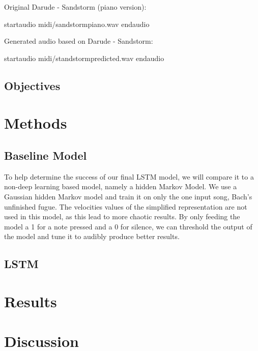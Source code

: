 \documentclass[11pt, twocolumn]{article}
\begin{document}
    \ifpdf
    \else
    Original Darude - Sandstorm (piano version):

    startaudio midi/sandstormpiano.wav endaudio

    Generated audio based on Darude - Sandstorm:

    startaudio midi/standstormpredicted.wav endaudio
    \fi

    \subsection{Objectives}


    \section{Methods}

    \subsection{Baseline Model}
    To help determine the success of our final LSTM model, we will compare it to a non-deep learning based model, namely a hidden Markov Model. We use a Gaussian hidden Markov model and train it on only the one input song, Bach's unfinished fugue. The velocities values of the simplified representation are not used in this model, as this lead to more chaotic results. By only feeding the model a 1 for a note pressed and a 0 for silence, we can threshold the output of the model and tune it to audibly produce better results.
    \subsection{LSTM}

    \lipsum[1-5]


    \section{Results}
    \section{Discussion}


    
    
\end{document}
